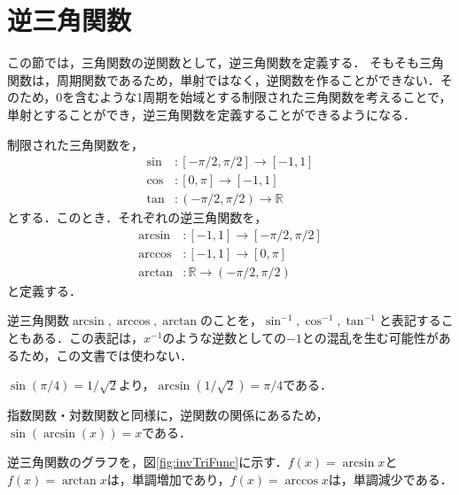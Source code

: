 \section{逆三角関数}
この節では，三角関数の逆関数として，逆三角関数を定義する．
そもそも三角関数は，周期関数であるため，単射ではなく，逆関数を作ることができない．そのため，0を含むような1周期を始域とする制限された三角関数を考えることで，単射とすることができ，逆三角関数を定義することができるようになる．
　
\begin{definition}[逆三角関数]
	制限された三角関数を，
	\begin{align*}
		\sin &: [-\pi/2, \pi/2] \rightarrow [-1, 1] \\
		\cos &: [0, \pi] \rightarrow [-1, 1] \\
		\tan &: (-\pi/2, \pi/2) \rightarrow \mathbb{R}
	\end{align*}
	とする．このとき．それぞれの逆三角関数を，
	\begin{align*}
		\arcsin &: [-1, 1] \rightarrow [-\pi/2, \pi/2] \\
		\arccos &: [-1, 1] \rightarrow [0, \pi] \\
		\arctan &: \mathbb{R} \rightarrow (-\pi/2, \pi/2)
	\end{align*}
	と定義する．
\end{definition}
\begin{rem*}
	逆三角関数$\arcsin, \arccos, \arctan$のことを，$\sin^{-1}, \cos^{-1}, \tan^{-1}$と表記することもある．この表記は，$x^{-1}$のような逆数としての$-1$との混乱を生む可能性があるため，この文書では使わない．
\end{rem*}
\begin{example*}
	$\sin(\pi/4) = 1/\sqrt{2}$より，$\arcsin(1/\sqrt{2}) = \pi/4$である．
\end{example*}
\begin{example*}
	指数関数・対数関数と同様に，逆関数の関係にあるため，$\sin(\arcsin(x)) = x$である．
\end{example*}

逆三角関数のグラフを，図\ref{fig:invTriFunc}に示す．$f(x) = \arcsin x$と$f(x) = \arctan x$は，単調増加であり，$f(x) = \arccos x$は，単調減少である．

